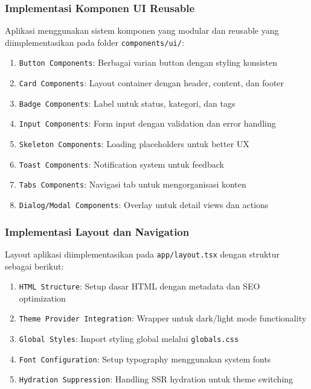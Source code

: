 \subsubsection{Implementasi Komponen UI Reusable}

Aplikasi menggunakan sistem komponen yang modular dan reusable yang diimplementasikan pada folder \texttt{components/ui/}:

\begin{enumerate}
    \item \texttt{Button Components}: Berbagai varian button dengan styling konsisten
    \item \texttt{Card Components}: Layout container dengan header, content, dan footer
    \item \texttt{Badge Components}: Label untuk status, kategori, dan tags
    \item \texttt{Input Components}: Form input dengan validation dan error handling
    \item \texttt{Skeleton Components}: Loading placeholders untuk better UX
    \item \texttt{Toast Components}: Notification system untuk feedback
    \item \texttt{Tabs Components}: Navigasi tab untuk mengorganisasi konten
    \item \texttt{Dialog/Modal Components}: Overlay untuk detail views dan actions
\end{enumerate}

\subsubsection{Implementasi Layout dan Navigation}

Layout aplikasi diimplementasikan pada \texttt{app/layout.tsx} dengan struktur sebagai berikut:

\begin{enumerate}
    \item \texttt{HTML Structure}: Setup dasar HTML dengan metadata dan SEO optimization
    \item \texttt{Theme Provider Integration}: Wrapper untuk dark/light mode functionality
    \item \texttt{Global Styles}: Import styling global melalui \texttt{globals.css}
    \item \texttt{Font Configuration}: Setup typography menggunakan system fonts
    \item \texttt{Hydration Suppression}: Handling SSR hydration untuk theme switching
\end{enumerate}

